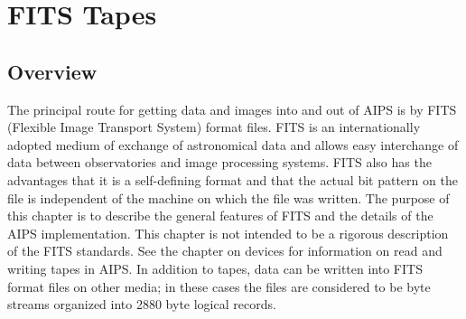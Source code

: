 \setcounter{chapter}{13} %
\chapter{FITS Tapes}
\setcounter{page}{1}
\section{Overview }
The principal route for getting data and images into and out of AIPS
is by FITS (Flexible Image Transport System) format files. FITS
is an internationally adopted medium of exchange of astronomical data
and allows easy interchange of data between observatories and image
processing systems.  FITS also has the advantages that it is a
self-defining format and that the actual bit pattern on the file is
independent of the machine on which the file was written.  The purpose
of this chapter is to describe the general features of FITS and the
details of the AIPS implementation.  This chapter is not intended to
be a rigorous description of the FITS standards.  See the chapter on
devices for information on read and writing tapes in AIPS.  In
addition to tapes, data can be written into FITS format files on other
media; in these cases the files are considered to be byte streams
organized into 2880 byte logical records.

